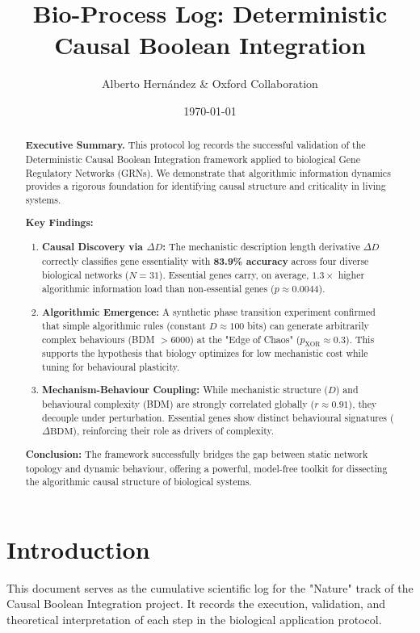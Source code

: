 \documentclass{article}
\title{Bio-Process Log: Deterministic Causal Boolean Integration}
\author{Alberto Hernández \& Oxford Collaboration}
\date{\today}
\begin{document}
\maketitle

\begin{abstract}
\textbf{Executive Summary.} This protocol log records the successful validation of the Deterministic Causal Boolean Integration framework applied to biological Gene Regulatory Networks (GRNs). We demonstrate that algorithmic information dynamics provides a rigorous foundation for identifying causal structure and criticality in living systems.

\textbf{Key Findings:}
\begin{enumerate}
    \item \textbf{Causal Discovery via $\Delta D$:} The mechanistic description length derivative $\Delta D$ correctly classifies gene essentiality with \textbf{83.9\% accuracy} across four diverse biological networks ($N=31$). Essential genes carry, on average, $1.3\times$ higher algorithmic information load than non-essential genes ($p \approx 0.0044$).
    \item \textbf{Algorithmic Emergence:} A synthetic phase transition experiment confirmed that simple algorithmic rules (constant $D \approx 100$ bits) can generate arbitrarily complex behaviours (BDM $> 6000$) at the "Edge of Chaos" ($p_{\text{XOR}} \approx 0.3$). This supports the hypothesis that biology optimizes for low mechanistic cost while tuning for behavioural plasticity.
    \item \textbf{Mechanism-Behaviour Coupling:} While mechanistic structure ($D$) and behavioural complexity (BDM) are strongly correlated globally ($r \approx 0.91$), they decouple under perturbation. Essential genes show distinct behavioural signatures ($\Delta \text{BDM}$), reinforcing their role as drivers of complexity.
\end{enumerate}

\textbf{Conclusion:} The framework successfully bridges the gap between static network topology and dynamic behaviour, offering a powerful, model-free toolkit for dissecting the algorithmic causal structure of biological systems.
\end{abstract}

\section{Introduction}
This document serves as the cumulative scientific log for the "Nature" track of the Causal Boolean Integration project. It records the execution, validation, and theoretical interpretation of each step in the biological application protocol.
\end{document}
